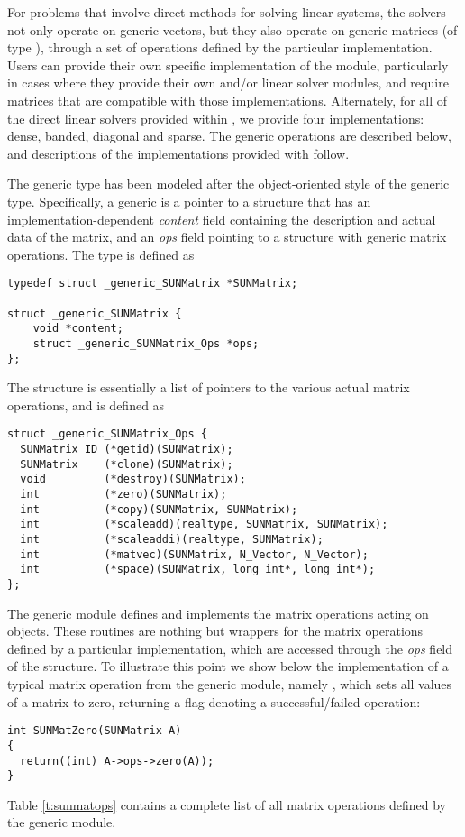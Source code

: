 %
For problems that involve direct methods for solving linear systems,
the {\sundials} solvers not only operate on generic vectors, but they
also operate on generic matrices (of type ), through a set of
operations defined by the particular {\sunmatrix} implementation.
Users can provide their own specific implementation of the
{\sunmatrix} module, particularly in cases where they provide their
own {\nvector} and/or linear solver modules, and require matrices that
are compatible with those implementations.  Alternately, for all of
the direct linear solvers provided within {\sundials}, we provide four
{\sunmatrix} implementations: dense, banded, diagonal and sparse.  The
generic operations are described below, and descriptions of the
implementations provided with {\sundials} follow.

The generic  type has been modeled after the
object-oriented style of the generic  type.
Specifically, a generic  is a pointer to a structure
that has an implementation-dependent {\em content} field containing
the description and actual data of the matrix, and an {\em ops} field 
pointing to a structure with generic matrix operations.
The type  is defined as
\begin{verbatim}
typedef struct _generic_SUNMatrix *SUNMatrix;

struct _generic_SUNMatrix {
    void *content;
    struct _generic_SUNMatrix_Ops *ops;
};
\end{verbatim}
The  structure is essentially a list of pointers to
the various actual matrix operations, and is defined as
\begin{verbatim}
struct _generic_SUNMatrix_Ops {
  SUNMatrix_ID (*getid)(SUNMatrix);
  SUNMatrix    (*clone)(SUNMatrix);
  void         (*destroy)(SUNMatrix);
  int          (*zero)(SUNMatrix);
  int          (*copy)(SUNMatrix, SUNMatrix);
  int          (*scaleadd)(realtype, SUNMatrix, SUNMatrix);
  int          (*scaleaddi)(realtype, SUNMatrix);
  int          (*matvec)(SUNMatrix, N_Vector, N_Vector);
  int          (*space)(SUNMatrix, long int*, long int*);
};
\end{verbatim}




The generic {\sunmatrix} module defines and implements the matrix operations 
acting on  objects.
These routines are nothing but wrappers for the matrix operations defined by
a particular {\sunmatrix} implementation, which are accessed through the {\em ops}
field of the  structure. To illustrate this point we
show below the implementation of a typical matrix operation from the
generic {\sunmatrix} module, namely , which sets all
values of a matrix  to zero, returning a flag denoting a
successful/failed operation:
\begin{verbatim}
int SUNMatZero(SUNMatrix A)
{
  return((int) A->ops->zero(A));
}
\end{verbatim}
Table \ref{t:sunmatops} contains a complete list of all matrix operations defined
by the generic {\sunmatrix} module.


